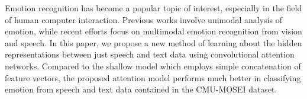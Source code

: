 Emotion recognition has become a popular topic of interest, especially in the field of human computer interaction. Previous works involve unimodal analysis of emotion, while recent efforts focus on multimodal emotion recognition from vision and speech. In this paper, we propose a new method of learning about the hidden representations between just speech and text data using convolutional attention networks. Compared to the shallow model which employs simple concatenation of feature vectors, the proposed attention model performs much better in classifying emotion from speech and text data contained in the CMU-MOSEI dataset.
